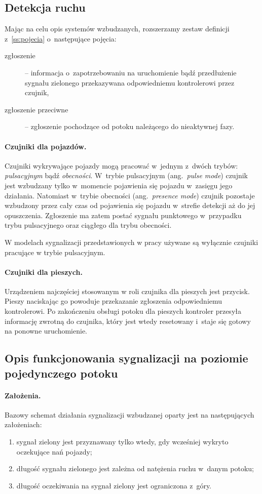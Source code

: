 \documentclass{pracamgr}
\newcommand{\ang}[1]{(ang.~\emph{#1})}
\theoremstyle{plain}
\begin{document}
\subsection{Detekcja ruchu}
\label{ss:detekcja} Mając na celu opis systemów wzbudzanych,
rozszerzamy zestaw definicji z~\ref{ss:pojecia} o~następujące
pojęcia:
\begin{description}
  \item[zgłoszenie] -- informacja o~zapotrzebowaniu na uruchomienie
  bądź przedłużenie sygnału zielonego przekazywana odpowiedniemu
  kontrolerowi przez czujnik,
  \item[zgłoszenie przeciwne] -- zgłoszenie pochodzące od potoku
  należącego do nieaktywnej fazy.
\end{description}

\paragraph{Czujniki dla pojazdów.} Czujniki wykrywające pojazdy mogą
pracować w~jednym z~dwóch trybów: \emph{pulsacyjnym} bądź
\emph{obecności}.  W~trybie pulsacyjnym \ang{pulse mode} czujnik jest
wzbudzany tylko w~momencie pojawienia się pojazdu w~zasięgu jego
działania.  Natomiast w~trybie obecności \ang{presence mode} czujnik
pozostaje wzbudzony przez cały czas od pojawienia się pojazdu
w~strefie detekcji aż do jej opuszczenia. Zgłoszenie ma zatem postać
sygnału punktowego w~przypadku trybu pulsacyjnego oraz ciągłego dla
trybu obecności.

W modelach sygnalizacji przedstawionych w pracy używane są wyłącznie
czujniki pracujące w trybie pulsacyjnym.

\paragraph{Czujniki dla pieszych.} Urządzeniem najczęściej stosowanym w
roli czujnika dla pieszych jest przycisk. Pieszy naciskając go powoduje
przekazanie zgłoszenia odpowiedniemu kontrolerowi. Po zakończeniu
obsługi potoku dla pieszych kontroler przesyła informację zwrotną do
czujnika, który jest wtedy resetowany i~staje się gotowy na ponowne
uruchomienie.

\subsection{Opis funkcjonowania sygnalizacji na poziomie pojedynczego
potoku}
\label{ss:schemat}

\paragraph{Założenia.} Bazowy schemat działania sygnalizacji wzbudzanej
oparty jest na następujących założeniach:
\begin{enumerate}
  \item sygnał zielony jest przyznawany tylko wtedy, gdy wcześniej
  wykryto oczekujące nań pojazdy;
  \item długość sygnału zielonego jest zależna od natężenia ruchu
  w~danym potoku;
  \item długość oczekiwania na sygnał zielony jest ograniczona z~góry.
\end{enumerate}
\end{document}
